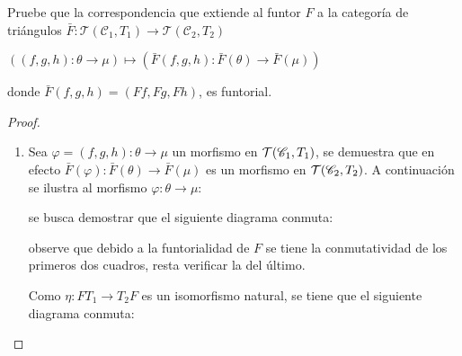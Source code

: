 \documentclass{article}
\begin{document}
\begin{enumerate}[label=\textbf{Ej \arabic*.}]
		\bigskip
		
		Pruebe que la correspondencia que extiende al funtor $F$ a la categor\'ia de tri\'angulos $\bar{F} :\mathcal{T}(\mathscr{C}_{1},T_{1})\to \mathcal{T}(\mathscr{C}_{2},T_{2})$
		\begin{center}
			$((f,g,h):\theta \to \mu)\longmapsto (\bar{F}(f,g,h):\bar{F}(\theta)\to \bar{F}(\mu))$ 
		\end{center} 
		donde $\bar{F}(f,g,h)=(Ff,Fg,Fh)$, es funtorial.
		
		
		\begin{proof}
			\begin{enumerate}
				\item Sea $\varphi=(f,g,h):\theta \to \mu$ un morfismo en $\mathcal{T}(\mathscr{C}_{1},T_{1})$, se demuestra que en efecto $\bar{F}(\varphi):\bar{F}(\theta) \to \bar{F}(\mu)$ es un morfismo en $\mathcal{T}(\mathscr{C}_{2},T_{2})$. A continuación se ilustra al morfismo $\varphi:\theta \to \mu$:
				
				\begin{center}
				\end{center}
				
				se busca demostrar que el siguiente diagrama conmuta:
				
				\begin{center}
				\end{center}
				
				observe que debido a la funtorialidad de $F$ se tiene la conmutatividad de los primeros dos cuadros, resta verificar la del \'ultimo.
				
				\bigskip
				
				Como $\eta:FT_{1}\to T_{2}F$ es un isomorfismo natural, se tiene que el siguiente diagrama conmuta:
				
				\begin{center}
				\end{center}
				

\end{enumerate}
\end{proof}
\end{enumerate}
\end{document}
